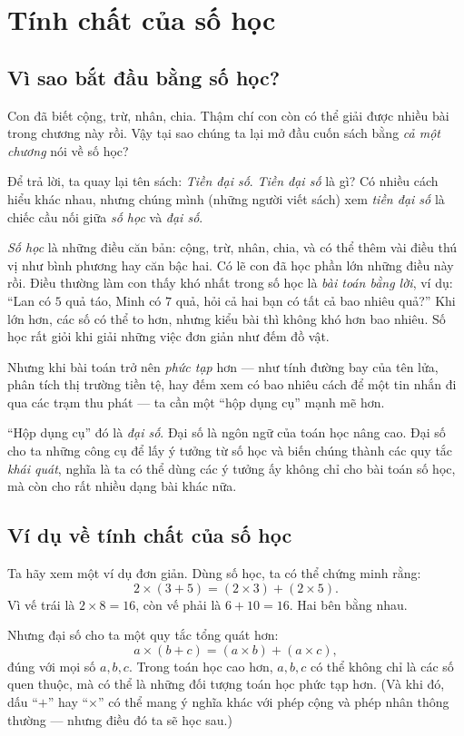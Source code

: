 \documentclass[12pt,a4paper]{book}
\begin{document}
\chapter{Tính chất của số học}
\section{Vì sao bắt đầu bằng số học?}

Con đã biết cộng, trừ, nhân, chia. Thậm chí con còn có thể giải
được nhiều bài trong chương này rồi. Vậy tại sao chúng ta lại mở
đầu cuốn sách bằng \emph{cả một chương} nói về số học?

Để trả lời, ta quay lại tên sách: \emph{Tiền đại số}. \emph{Tiền
đại số} là gì? Có nhiều cách hiểu khác nhau, nhưng chúng mình
(những người viết sách) xem \emph{tiền đại số} là chiếc cầu nối
giữa \emph{số học} và \emph{đại số}.

\emph{Số học} là những điều căn bản: cộng, trừ, nhân, chia, và có
thể thêm vài điều thú vị như bình phương hay căn bậc hai. Có lẽ
con đã học phần lớn những điều này rồi. Điều thường làm con thấy
khó nhất trong số học là \emph{bài toán bằng lời}, ví dụ: “Lan có
$5$ quả táo, Minh có $7$ quả, hỏi cả hai bạn có tất cả bao nhiêu
quả?” Khi lớn hơn, các số có thể to hơn, nhưng kiểu bài thì không
khó hơn bao nhiêu. Số học rất giỏi khi giải những việc đơn giản
như đếm đồ vật. 

Nhưng khi bài toán trở nên \emph{phức tạp} hơn — như tính đường
bay của tên lửa, phân tích thị trường tiền tệ, hay đếm xem có bao
nhiêu cách để một tin nhắn đi qua các trạm thu phát — ta cần một
“hộp dụng cụ” mạnh mẽ hơn.

“Hộp dụng cụ” đó là \emph{đại số}. Đại số là ngôn ngữ của toán
học nâng cao. Đại số cho ta những công cụ để lấy ý tưởng từ số học
và biến chúng thành các quy tắc \emph{khái quát}, nghĩa là ta có
thể dùng các ý tưởng ấy không chỉ cho bài toán số học, mà còn cho
rất nhiều dạng bài khác nữa.

\section{Ví dụ về tính chất của số học}

Ta hãy xem một ví dụ đơn giản. Dùng số học, ta có thể chứng minh rằng:
\[
2\times(3+5)=(2\times3)+(2\times5).
\]
Vì vế trái là $2\times8=16$, còn vế phải là $6+10=16$. Hai bên bằng nhau.

Nhưng đại số cho ta một quy tắc tổng quát hơn:
\[
a\times(b+c)=(a\times b)+(a\times c),
\]
đúng với mọi số $a,b,c$. Trong toán học cao hơn, $a,b,c$ có thể không
chỉ là các số quen thuộc, mà có thể là những đối tượng toán học phức
tạp hơn. (Và khi đó, dấu “$+$” hay “$\times$” có thể mang ý nghĩa khác
với phép cộng và phép nhân thông thường — nhưng điều đó ta sẽ học sau.)
\end{document}
